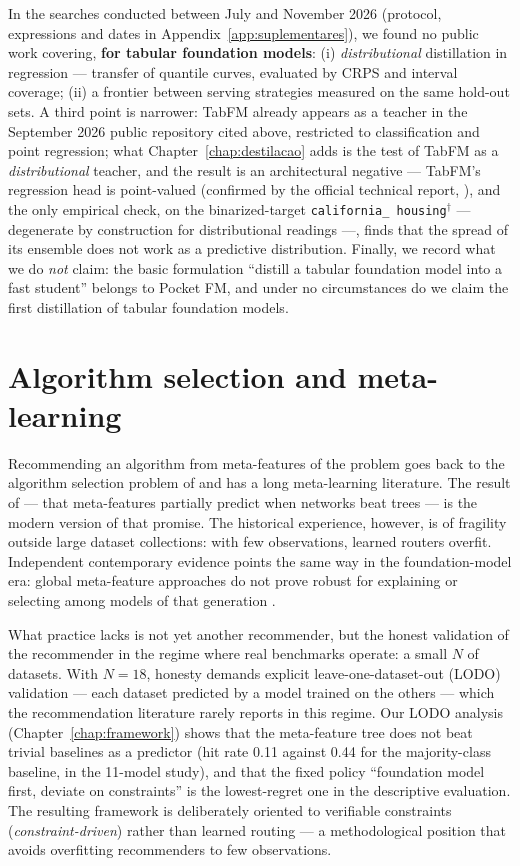 In the searches conducted between July and November 2026 (protocol,
expressions and dates in Appendix~\ref{app:suplementares}), we
found no public work covering, \textbf{for tabular foundation
models}: (i) \emph{distributional} distillation in regression ---
transfer of quantile curves, evaluated by CRPS and interval
coverage; (ii) a frontier between serving strategies measured on
the same hold-out sets. A third point is narrower: TabFM already
appears as a teacher in the September 2026 public repository cited
above, restricted to classification and point regression; what
Chapter~\ref{chap:destilacao} adds is the test of TabFM as a
\emph{distributional} teacher, and the result is an architectural
negative --- TabFM's regression head is point-valued (confirmed by
the official technical report, \citealp{kong2026}), and the only
empirical check, on the
binarized-target \texttt{california\_\allowbreak
housing}$^\dagger$ --- degenerate by construction for
distributional readings ---, finds that the spread
of its ensemble does not work as a predictive
distribution. Finally, we record what we do \emph{not} claim: the
basic formulation ``distill a tabular foundation model into a fast
student'' belongs to Pocket FM, and under no circumstances do we
claim the first distillation of tabular foundation models.

\section{Algorithm selection and meta-learning}
\label{sec:rel-selecao}

Recommending an algorithm from meta-features of the problem goes
back to the algorithm selection problem of \citet{rice1976} and has
a long meta-learning literature. The result of
\citet{mcelfresh2023} --- that meta-features partially predict when
networks beat trees --- is the modern version of that promise. The
historical experience, however, is of fragility outside large
dataset collections: with few observations, learned routers
overfit. Independent contemporary evidence points the same way in
the foundation-model era: global meta-feature approaches do not
prove robust for explaining or selecting among models of that
generation \citep{herre2026}.

What practice lacks is not yet another recommender, but the honest
validation of the recommender in the regime where real benchmarks
operate: a small $N$ of datasets. With $N{=}18$, honesty demands
explicit leave-one-dataset-out (LODO) validation --- each dataset
predicted by a model trained on the others --- which the
recommendation literature rarely reports in this regime. Our LODO
analysis (Chapter~\ref{chap:framework}) shows that the
meta-feature tree does not beat trivial baselines as a predictor
(hit rate 0.11 against 0.44 for the majority-class baseline, in
the 11-model study), and that the fixed policy ``foundation model
first, deviate on constraints'' is the lowest-regret one in the
descriptive evaluation. The resulting framework is deliberately
oriented to verifiable constraints (\emph{constraint-driven})
rather than learned routing --- a methodological position that
avoids overfitting recommenders to few observations.

